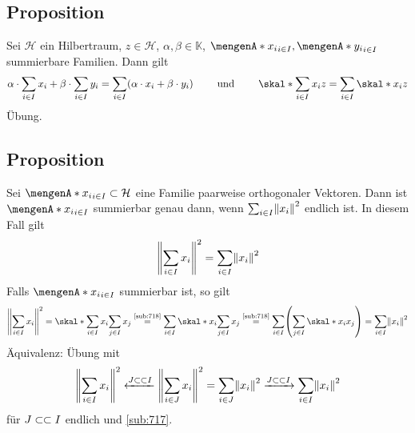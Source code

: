 \subsection{Proposition} %
\label{sub:718}
Sei $\mathcal{H}$ ein Hilbertraum, $z \in \mathcal{H}$, $\alpha, \beta \in \mathds{K}$, $\set{x_i}_{i \in I}, \set{y_i}_{i \in I}$ summierbare Familien. Dann gilt
\begin{align*}
	\alpha \cdot \sum_{i \in I} x_i + \beta \cdot \sum_{i \in I} y_i = \sum_{i \in I} \enbrace*{\alpha \cdot x_i + \beta \cdot y_i} 
	\qquad \text{ und } \qquad 
	\skal*{\sum_{i \in I} x_i}{z} = \sum_{i \in I} \skal*{x_i}{z}
\end{align*}
Übung. \bewende

\subsection[Proposition: Kriterium für die Summierbarkeit orthogonaler Vektoren]{Proposition} %
\label{sub:719}
Sei $\set{x_i}_{i \in I}\subset \mathcal{H}$ eine Familie paarweise orthogonaler Vektoren. Dann ist $\set{x_i}_{i \in I}$ summierbar genau dann, wenn 
$\sum_{i \in I} \norm{x_i}^2$ endlich ist. In diesem Fall gilt
\[
	\norm{\sum_{i \in I}x_i}^2 = \sum_{i \in I} \norm{x_i}^2  
\]
Falls $\set{x_i}_{i \in I}$ summierbar ist, so gilt
\begin{align*}
	\norm{\sum_{i \in I} x_i}^2 =  
	\skal*{\sum_{i \in I}x_i}{\sum_{j \in I} x_j} \stackrel{\text{\ref{sub:718}}}{=} \sum_{i \in I} \skal*{x_i}{\sum_{j \in I} x_j}\stackrel{\text{\ref{sub:718}}}{=}
	\sum_{i \in I} \enbrace*{\sum_{j \in I} \skal*{x_i}{x_j}} = \sum_{i \in I} \norm{x_i}^2  
\end{align*}
Äquivalenz: Übung mit 
\[
	\norm{\sum_{i \in I}x_i}^2 \xleftarrow{J \finSub I}\norm{\sum_{i \in J} x_i}^2 = \sum_{i \in J} \norm{x_i}^2 \xrightarrow{J \finSub I} \sum_{i \in I} \norm{x_i}^2  
\]
für $J \subset\mkern-0.7mu \subset I$ endlich und \ref{sub:717}. \bewende

